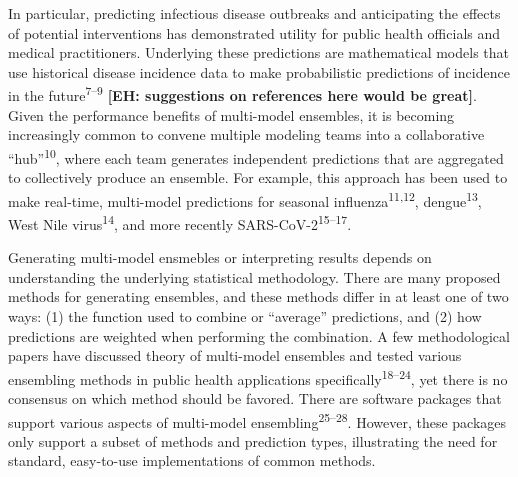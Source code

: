 \documentclass[
  letterpaper,
  DIV=11,
  numbers=noendperiod]{scrartcl}
\begin{document}
In particular, predicting infectious disease outbreaks and anticipating
the effects of potential interventions has demonstrated utility for
public health officials and medical practitioners. Underlying these
predictions are mathematical models that use historical disease
incidence data to make probabilistic predictions of incidence in the
future\textsuperscript{7--9} \textbf{{[}EH: suggestions on references
here would be great{]}}. Given the performance benefits of multi-model
ensembles, it is becoming increasingly common to convene multiple
modeling teams into a collaborative ``hub''\textsuperscript{10}, where
each team generates independent predictions that are aggregated to
collectively produce an ensemble. For example, this approach has been
used to make real-time, multi-model predictions for seasonal
influenza\textsuperscript{11,12}, dengue\textsuperscript{13}, West Nile
virus\textsuperscript{14}, and more recently
SARS-CoV-2\textsuperscript{15--17}.

Generating multi-model ensmebles or interpreting results depends on
understanding the underlying statistical methodology. There are many
proposed methods for generating ensembles, and these methods differ in
at least one of two ways: (1) the function used to combine or
``average'' predictions, and (2) how predictions are weighted when
performing the combination. A few methodological papers have discussed
theory of multi-model ensembles and tested various ensembling methods in
public health applications specifically\textsuperscript{18--24}, yet
there is no consensus on which method should be favored. There are
software packages that support various aspects of multi-model
ensembling\textsuperscript{25--28}. However, these packages only support
a subset of methods and prediction types, illustrating the need for
standard, easy-to-use implementations of common methods.
\end{document}
